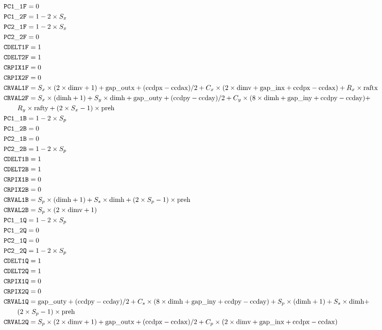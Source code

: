 \documentclass{article}[12pt]
\begin{document}
{\begin{align*}
& {\tt PC1\_1F} = 0  \\
& {\tt PC1\_2F} = 1 - 2 \times S_x \\
& {\tt PC2\_1F} = 1 - 2 \times S_x \\
& {\tt PC2\_2F} = 0 \\
& {\tt CDELT1F} = 1 \\
& {\tt CDELT2F} = 1 \\
& {\tt CRPIX1F} = 0 \\
& {\tt CRPIX2F} = 0 \\
& {\tt CRVAL1F} = S_x \times (2 \times {\rm dimv} + 1) + {\rm gap\_outx} + ({\rm ccdpx} - {\rm ccdax})/2 +  C_x \times (2 \times {\rm dimv} + {\rm gap\_inx} + {\rm ccdpx} - {\rm ccdax}) +R_x \times {\rm raftx} \\
& {\tt CRVAL2F} = S_x \times ({\rm dimh} + 1) + S_y \times {\rm dimh} +  {\rm gap\_outy} + ({\rm ccdpy} -  {\rm ccday})/2 + C_y \times ( 8 \times {\rm dimh} + {\rm gap\_iny} + {\rm ccdpy} - {\rm ccday}) + \\  &\qquad {} R_y \times {\rm rafty} + (2 \times S_x - 1) \times {\rm preh}  \\
& {\tt PC1\_1B} = 1 - 2 \times S_p  \\
& {\tt PC1\_2B} = 0 \\
& {\tt PC2\_1B} = 0 \\
& {\tt PC2\_2B} = 1 - 2 \times S_p \\
& {\tt CDELT1B} = 1 \\
& {\tt CDELT2B} = 1 \\
& {\tt CRPIX1B} = 0 \\
& {\tt CRPIX2B} = 0 \\
& {\tt CRVAL1B} = S_p \times ({\rm dimh} + 1) + S_s \times {\rm dimh} + (2 \times S_p -1) \times {\rm preh} \\
& {\tt CRVAL2B} = S_p \times (2 \times {\rm dimv} + 1)  \\
& {\tt PC1\_1Q} = 1 - 2 \times S_p  \\
& {\tt PC1\_2Q} = 0 \\
& {\tt PC2\_1Q} = 0 \\
& {\tt PC2\_2Q} = 1 - 2 \times S_p  \\
& {\tt CDELT1Q} = 1 \\
& {\tt CDELT2Q} = 1 \\
& {\tt CRPIX1Q} = 0 \\
& {\tt CRPIX2Q} = 0 \\
& {\tt CRVAL1Q} = {\rm gap\_outy} + ({\rm ccdpy} - {\rm ccday})/2 + C_s \times (8 \times {\rm dimh} + {\rm gap\_iny} + {\rm ccdpy} - {\rm ccday}) + S_p \times ({\rm dimh} + 1) + S_s \times {\rm dimh} + \\ &\qquad{} (2 \times S_p -1) \times {\rm preh}  \\
& {\tt CRVAL2Q} = S_p \times (2 \times {\rm dimv} + 1) +  {\rm gap\_outx} + ({\rm ccdpx} - {\rm ccdax})/2 + C_p \times ( 2 \times {\rm dimv} + {\rm gap\_inx} + {\rm ccdpx} - {\rm ccdax}) \\
\end{align*}

}
\end{document}

